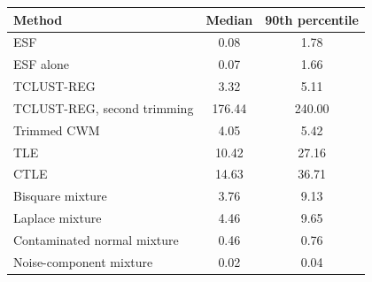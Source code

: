 \begin{tabular}{lcc}
\toprule
Method & Median & 90th percentile \\
\midrule
ESF & 0.08 & 1.78 \\
ESF alone & 0.07 & 1.66 \\
TCLUST-REG & 3.32 & 5.11 \\
TCLUST-REG, second trimming & 176.44 & 240.00 \\
Trimmed CWM & 4.05 & 5.42 \\
TLE & 10.42 & 27.16 \\
CTLE & 14.63 & 36.71 \\
Bisquare mixture & 3.76 & 9.13 \\
Laplace mixture & 4.46 & 9.65 \\
Contaminated normal mixture & 0.46 & 0.76 \\
Noise-component mixture & 0.02 & 0.04 \\
\bottomrule
\end{tabular}
